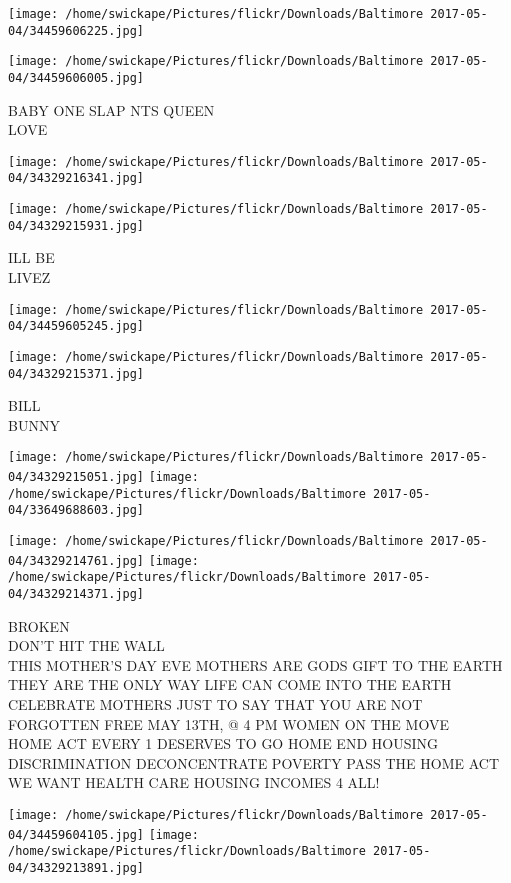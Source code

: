 \documentclass[10pt,letterpaper]{article}
\begin{document}
\texttt{[image: /home/swickape/Pictures/flickr/Downloads/Baltimore 2017-05-04/34459606225.jpg]}

\vspace{0.25in}
\texttt{[image: /home/swickape/Pictures/flickr/Downloads/Baltimore 2017-05-04/34459606005.jpg]}

BABY ONE SLAP NTS QUEEN\\
LOVE
\pagebreak

\texttt{[image: /home/swickape/Pictures/flickr/Downloads/Baltimore 2017-05-04/34329216341.jpg]}

\vspace{0.25in}
\texttt{[image: /home/swickape/Pictures/flickr/Downloads/Baltimore 2017-05-04/34329215931.jpg]}

ILL BE\\
LIVEZ
\pagebreak

\texttt{[image: /home/swickape/Pictures/flickr/Downloads/Baltimore 2017-05-04/34459605245.jpg]}

\vspace{0.25in}
\texttt{[image: /home/swickape/Pictures/flickr/Downloads/Baltimore 2017-05-04/34329215371.jpg]}

BILL\\
BUNNY
\pagebreak

\texttt{[image: /home/swickape/Pictures/flickr/Downloads/Baltimore 2017-05-04/34329215051.jpg]}
\texttt{[image: /home/swickape/Pictures/flickr/Downloads/Baltimore 2017-05-04/33649688603.jpg]}

\texttt{[image: /home/swickape/Pictures/flickr/Downloads/Baltimore 2017-05-04/34329214761.jpg]}
\texttt{[image: /home/swickape/Pictures/flickr/Downloads/Baltimore 2017-05-04/34329214371.jpg]}

BROKEN\\
DON'T HIT THE WALL\\
THIS MOTHER'S DAY EVE MOTHERS ARE GODS GIFT TO THE EARTH THEY ARE THE ONLY WAY LIFE CAN COME INTO THE EARTH CELEBRATE MOTHERS JUST TO SAY THAT YOU ARE NOT FORGOTTEN FREE MAY 13TH, @ 4 PM WOMEN ON THE MOVE\\
HOME ACT EVERY 1 DESERVES TO GO HOME END HOUSING DISCRIMINATION DECONCENTRATE POVERTY PASS THE HOME ACT WE WANT HEALTH CARE HOUSING INCOMES 4 ALL!
\pagebreak

\texttt{[image: /home/swickape/Pictures/flickr/Downloads/Baltimore 2017-05-04/34459604105.jpg]}
\texttt{[image: /home/swickape/Pictures/flickr/Downloads/Baltimore 2017-05-04/34329213891.jpg]}
\end{document}
